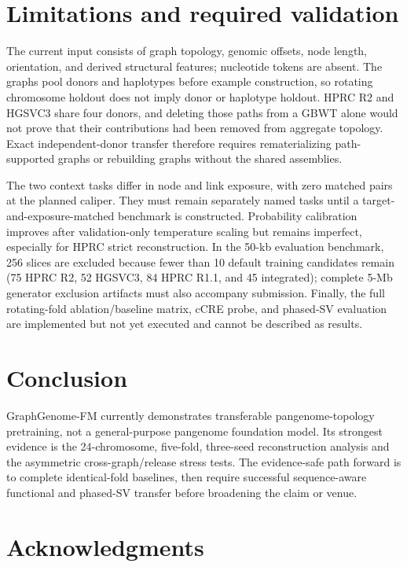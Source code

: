\IfFileExists{ws-procs11x85.cls}{\worldscientificclasstrue\documentclass{ws-procs11x85}}{\worldscientificclassfalse\documentclass[11pt]{article}\usepackage[margin=1in]{geometry}}
\begin{document}
\section{Limitations and required validation}
\label{sec:limits}

The current input consists of graph topology, genomic offsets, node length,
orientation, and derived structural features; nucleotide tokens are absent.
The graphs pool donors and haplotypes before example construction, so rotating
chromosome holdout does not imply donor or haplotype holdout. HPRC R2 and HGSVC3
share four donors, and deleting those paths from a GBWT alone would not prove
that their contributions had been removed from aggregate topology. Exact
independent-donor transfer therefore requires rematerializing path-supported
graphs or rebuilding graphs without the shared assemblies.

The two context tasks differ in node and link exposure, with zero matched pairs
at the planned caliper. They must remain separately named tasks until a
target-and-exposure-matched benchmark is constructed. Probability calibration
improves after validation-only temperature scaling but remains imperfect,
especially for HPRC strict reconstruction. In the 50-kb evaluation benchmark,
256 slices are excluded because fewer than 10 default training candidates
remain (75 HPRC R2, 52 HGSVC3, 84 HPRC R1.1, and 45 integrated); complete
5-Mb generator exclusion artifacts must also accompany submission. Finally,
the full rotating-fold ablation/baseline matrix, cCRE probe, and phased-SV
evaluation are implemented but not yet executed and cannot be described as
results.

\section{Conclusion}

GraphGenome-FM currently demonstrates transferable pangenome-topology
pretraining, not a general-purpose pangenome foundation model. Its strongest
evidence is the 24-chromosome, five-fold, three-seed reconstruction analysis and
the asymmetric cross-graph/release stress tests. The evidence-safe path forward
is to complete identical-fold baselines, then require successful sequence-aware
functional and phased-SV transfer before broadening the claim or venue.

\section*{Acknowledgments}
\end{document}
